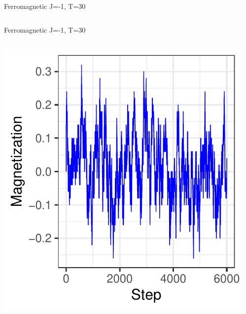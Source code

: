 \documentclass{beamer}
\begin{document}
\begin{frame}{Ferromagnetic J=-1, T=30}
\begin{columns}
\begin{column}{0.5\textwidth}
\begin{center}
     \end{center}
\end{column}
\end{columns}
\end{frame}

\begin{frame}{Ferromagnetic J=-1, T=30}
\begin{columns}
\begin{column}{0.5\textwidth}
    \begin{center}
     \includegraphics[width=\textwidth]{Pic/J-1_10_6000_T=30_Magnetization.pdf}
     \end{center}
\end{column}
\begin{column}{0.5\textwidth}
    \begin{center}

\end{center}
\end{column}
\end{columns}
\end{frame}
\end{document}
